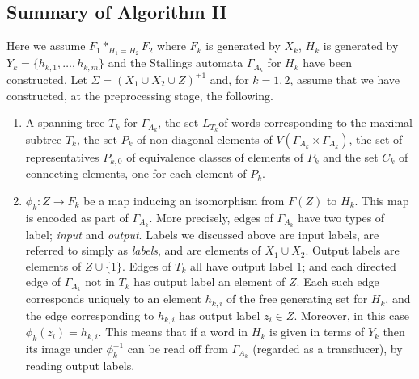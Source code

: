 \documentclass[a4paper,12pt]{article}
\newcommand{\G}{\Gamma }
\renewcommand{\S}{\Sigma }
\numberwithin{equation}{section}
\numberwithin{figure}{section}
\newcommand{\maps}{\rightarrow}
\newcommand{\be}{\begin{enumerate}}
\newcommand{\ee}{\end{enumerate}}
\begin{document}
\subsection{Summary of Algorithm II}
Here we assume $F_1*_{H_1=H_2} F_2$
 where $F_k$ is generated by $X_k$, $H_k$ is generated
by $Y_k=\{h_{k,1},\ldots, h_{k,m}\}$
and the Stallings automata $\G_{A_k}$ for $H_k$ have
been constructed. Let  $\S=(X_1\cup X_2\cup Z)^{\pm 1}$ and, for $k=1,2$,
assume that we have constructed, at the preprocessing stage, the following.
\be
\item
A spanning tree  $T_k$ for $\G_{A_k}$,
 the set $L_{T_k}$of words corresponding to the  maximal subtree $T_k$,
the set $P_k$ of non-diagonal elements of
$V( \G_{A_k}\times \G_{A_k})$,
 the set of representatives  $P_{k,0}$ of equivalence classes of
elements of $P_k$ and the
set $C_k$ of connecting elements, one for each element of $P_k$.
\item $\phi_k:Z\maps F_k$ be a map inducing an isomorphism from $F(Z)$ to
$H_k$. This map is encoded as part of $\G_{A_k}$. More precisely,
edges of $\G_{A_k}$ have two types of label; \emph{input} and \emph{output}.
Labels we discussed above are input labels, are
referred to simply as \emph{labels}, and are elements of $X_1\cup X_2$.
Output labels are elements of  $Z\cup \{1\}$.
 Edges of $T_k$  all have output label $1$; and each directed
edge of $\G_{A_k}$ not in $T_k$ has output
label an element of $Z$. Each such edge corresponds uniquely to
 an element $h_{k,i}$ of the free generating set for $H_k$, and the edge
corresponding to $h_{k,i}$ has
 output label  $z_i\in Z$. Moreover, in this case $\phi_k(z_i)=h_{k,i}$.
  This means that if a word in $H_k$ is given in terms of $Y_k$  then its
image under $\phi_k^{-1}$ can be read off from $\G_{A_k}$ (regarded as a
 transducer), by reading output labels.
\ee
\end{document}
